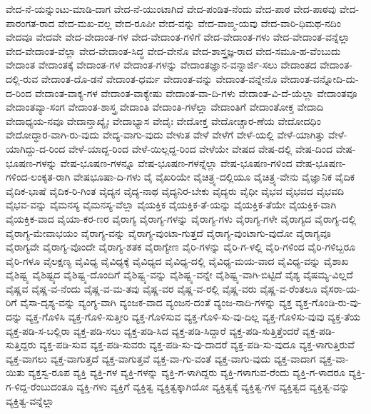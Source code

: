 ವೇದ-ನೆ-ಯನ್ನುಂಟು-ಮಾಡಿ-ದಾಗ
ವೇದ-ನೆ-ಯುಂಟಾಗಿದೆ
ವೇದ-ಪಂಡಿತ-ನೆಂದು
ವೇದ-ಪಾಠ
ವೇದ-ಪಾಠವು
ವೇದ-ಪಾರಂಗತ-ರಾದ
ವೇದ-ಮಖ-ವಲ್ಲ
ವೇದ-ರೂಪೀ
ವೇದ-ವನ್ನು
ವೇದ-ವಾಙ್ಮ-ಯವು
ವೇದ-ವಾರಿ-ಧಿಮಥ-ನದಿಂ
ವೇದವೂ
ವೇದವೇ
ವೇದ-ವೇದಾಂತ-ಗಳ
ವೇದ-ವೇದಾಂತ-ಗಳಿಗೆ
ವೇದ-ವೇದಾಂತ-ಗಳು
ವೇದ-ವೇದಾಂತ-ವನ್ನೆಲ್ಲಾ
ವೇದ-ವೇದಾಂತ-ವೆಲ್ಲಾ
ವೇದ-ವೇದಾಂತ-ಸಿದ್ಧ
ವೇದ-ವೇನೊ
ವೇದ-ಶಾಸ್ತ್ರಜ್ಞ-ರಾದ
ವೇದ-ಸಮೂ-ಹ-ವೆಂಬುದು
ವೇದಾಂತ
ವೇದಾಂತಕ್ಕೆ
ವೇದಾಂತ-ಗಳ
ವೇದಾಂತ-ಗಳನ್ನು
ವೇದಾಂತಜ್ಞಾನ-ವನ್ನಾರ್ಜಿ-ಸಲು
ವೇದಾಂತದ
ವೇದಾಂತ-ದಲ್ಲಿ-ರುವ
ವೇದಾಂತ-ದೊ-ಡನೆ
ವೇದಾಂತ-ಧರ್ಮ
ವೇದಾಂತ-ವನ್ನು
ವೇದಾಂತ-ವನ್ನೇನೊ
ವೇದಾಂತ-ವನ್ನೋದಿ-ದು-ದ-ರಿಂದ
ವೇದಾಂತ-ವಾಕ್ಯ-ಗಳ
ವೇದಾಂತ-ವಾಕ್ಯೇಷು
ವೇದಾಂತ-ವಾ-ದಿ-ಗಳು
ವೇದಾಂತ-ವಿ-ದೆ-ಯೆಲ್ಲಾ
ವೇದಾಂತವೂ
ವೇದಾಂತವ್ಯಾ-ಸಂಗ
ವೇದಾಂತ-ಶಾಸ್ತ್ರ
ವೇದಾಂತಿ
ವೇದಾಂತಿ-ಗಳೆಲ್ಲಾ
ವೇದಾಂತಿಗೆ
ವೇದಾಂತೋಕ್ತ
ವೇದಾದಿ
ವೇದಾಧ್ಯಯ-ನವೂ
ವೇದಾನ್ತಾಖ್ಯೈಃ
ವೇದಾಭ್ಯಾಸ
ವೇದೈಃ
ವೇದೋಕ್ತ
ವೇದೋಚ್ಚಾರ-ಣೆಯ
ವೇದೋದಧಿಂ
ವೇದೋದ್ಧಾರ-ವಾಗಿ-ರು-ವುದು
ವೇದ್ಯ-ವಾಗು-ವುದು
ವೇಳುತ
ವೇಳೆ
ವೇಳೆಗೆ
ವೇಳೆ-ಯಲ್ಲಿ
ವೇಳೆ-ಯಾಗಿತ್ತು
ವೇಳೆ-ಯಾಗಿದ್ದು-ದ-ರಿಂದ
ವೇಳೆ-ಯಾದ್ದ-ರಿಂದ
ವೇಳೆ-ಯಿಲ್ಲದ್ದ-ರಿಂದ
ವೇಳೆಯೇ
ವೇಷದ
ವೇಷ-ದಲ್ಲಿ
ವೇಷ-ದಿಂದ
ವೇಷ-ಭೂಷಣ-ಗಳನ್ನು
ವೇಷ-ಭೂಷಣ-ಗಳನ್ನೂ
ವೇಷ-ಭೂಷಣ-ಗಳನ್ನೆಲ್ಲಾ
ವೇಷ-ಭೂಷಣ-ಗಳಿಂದ
ವೇಷ-ಭೂಷಣ-ಗಳಿಂದ-ಲಂಕೃತ-ರಾಗಿ
ವೇಷಭೂಷಾ-ದಿ-ಗಳು
ವೈ
ವೈಖರಿಯೇ
ವೈಚಿತ್ರ್ಯ-ದಲ್ಲಿಯೂ
ವೈಚಿತ್ರ್ಯ-ವೇನು
ವೈಜ್ಞಾನಿಕ
ವೈದಿಕ
ವೈದಿಕ-ಭಾಷೆ
ವೈದಿಕ-ರಿ-ಗಿಂತ
ವೈದ್ಯನ
ವೈದ್ಯ-ನಾಥ
ವೈದ್ಯನಿರ-ಬೇಕು
ವೈದ್ಯರು
ವೈಧೀ
ವೈಭವ
ವೈಭವದ
ವೈಭವದಿ
ವೈಭವ-ವನ್ನು
ವೈಮನಸ್ಯ
ವೈಮನಸ್ಯ-ವೆಲ್ಲಾ
ವೈಯಕ್ತಿಕ
ವೈಯಕ್ತಿಕ-ತೆ-ಯನ್ನು
ವೈಯಕ್ತಿಕ-ತೆಯೇ
ವೈಯಕ್ತಿಕ-ವಾಗಿ
ವೈಯಕ್ತಿಕ-ವಾದ
ವೈಯಾ-ಕರ-ಣರ
ವೈರಾಗ್ಯ
ವೈರಾಗ್ಯ-ಗಳನ್ನು
ವೈರಾಗ್ಯ-ಗಳು
ವೈರಾಗ್ಯ-ಗಳೇ
ವೈರಾಗ್ಯದ
ವೈರಾಗ್ಯ-ದಲ್ಲಿ
ವೈರಾಗ್ಯ-ಮೇವಾಭಯಂ
ವೈರಾಗ್ಯ-ವನ್ನು
ವೈರಾಗ್ಯ-ವುಂಟಾ-ಗುತ್ತದೆ
ವೈರಾಗ್ಯ-ವುಂಟಾಗು-ವುದೋ
ವೈರಾಗ್ಯವೂ
ವೈರಾಗ್ಯವೇ
ವೈರಾಗ್ಯ-ವೊಂದೇ
ವೈರಾಗ್ಯ-ಶತಕ
ವೈರಾಗ್ಯೇಣ
ವೈರಿ-ಗಳನ್ನು
ವೈರಿ-ಗ-ಳಲ್ಲಿ
ವೈರಿ-ಗಳಿಂದ
ವೈರಿ-ಗಳಿಬ್ಬರೂ
ವೈರಿ-ಗಳೂ
ವೈಲಕ್ಷಣ್ಯ
ವೈವಿಧ್ಯ
ವೈವಿಧ್ಯಕ್ಕೆ
ವೈವಿಧ್ಯದ
ವೈವಿಧ್ಯ-ದಲ್ಲಿ
ವೈವಿಧ್ಯ-ಮಯ-ವಾದ
ವೈವಿಧ್ಯ-ವನ್ನು
ವೈಶಾಖ
ವೈಶಿಷ್ಟ್ಯ
ವೈಶಿಷ್ಟ್ಯದ
ವೈಶಿಷ್ಟ್ಯ-ದೊಂದಿಗೆ
ವೈಶಿಷ್ಟ್ಯ-ವನ್ನು
ವೈಶಿಷ್ಟ್ಯ-ವನ್ನೇ
ವೈಶಿಷ್ಟ್ಯ-ವಾಗಿ-ಬಿಟ್ಟಿದೆ
ವೈಶ್ಯ
ವೈಷಮ್ಯ-ವಿಲ್ಲದೆ
ವೈಷ್ಣವ
ವೈಷ್ಣ-ವ-ನೆಂದು
ವೈಷ್ಣ-ವ-ಮ-ತವು
ವೈಷ್ಣ-ವರ
ವೈಷ್ಣ-ವ-ರಲ್ಲಿ
ವೈಷ್ಣ-ವರು
ವೈಷ್ಣ-ವ-ರೆಂತಲೂ
ವೈಸರಾ-ಯ-ರಿಗೆ
ವೈಸಾ-ದೃಶ್ಯ-ವನ್ನು
ವ್ಯಂಗ್ಯ-ವಾಗಿ
ವ್ಯಂಜಕ-ವಾದ
ವ್ಯಂಜನ-ದಂತೆ
ವ್ಯಂಜ-ನಾದಿ-ಗಳನ್ನು
ವ್ಯಕ್ತ
ವ್ಯಕ್ತ-ಗೊಂಡಿ-ರು-ವು-ದನ್ನು
ವ್ಯಕ್ತ-ಗೊಳಿಸಿ
ವ್ಯಕ್ತ-ಗೊಳಿ-ಸುತ್ತೀರಿ
ವ್ಯಕ್ತ-ಗೊಳಿಸುವ
ವ್ಯಕ್ತ-ಗೊಳಿ-ಸು-ವು-ದಿಲ್ಲ
ವ್ಯಕ್ತ-ಗೊಳಿಸು-ವುವು
ವ್ಯಕ್ತ-ತೆಯ
ವ್ಯಕ್ತ-ಪಡಿ-ಸ-ಬಲ್ಲಿರಾ
ವ್ಯಕ್ತ-ಪಡಿ-ಸಲು
ವ್ಯಕ್ತ-ಪಡಿ-ಸಿದ
ವ್ಯಕ್ತ-ಪಡಿ-ಸಿದ್ದಾರೆ
ವ್ಯಕ್ತ-ಪಡಿ-ಸುತ್ತಿತ್ತೆಂದರೆ
ವ್ಯಕ್ತ-ಪಡಿ-ಸುತ್ತಿದ್ದರು
ವ್ಯಕ್ತ-ಪಡಿ-ಸುವ
ವ್ಯಕ್ತ-ಪಡಿ-ಸುವರು
ವ್ಯಕ್ತ-ಪಡಿ-ಸು-ವು-ದಾದರೆ
ವ್ಯಕ್ತ-ಪಡಿ-ಸು-ವುದೂ
ವ್ಯಕ್ತ-ಳಾಗುತ್ತಿರುವೆ
ವ್ಯಕ್ತ-ವಾಗಲು
ವ್ಯಕ್ತ-ವಾಗುತ್ತದೆ
ವ್ಯಕ್ತ-ವಾಗುತ್ತವೆ
ವ್ಯಕ್ತ-ವಾ-ಗು-ವಂತೆ
ವ್ಯಕ್ತ-ವಾಗು-ವುದು
ವ್ಯಕ್ತ-ವಾದಾಗ
ವ್ಯಕ್ತ-ವಾ-ಯಿತು
ವ್ಯಕ್ತಸ್ವ-ರೂಪ
ವ್ಯಕ್ತಿ
ವ್ಯಕ್ತಿ-ಗಳ
ವ್ಯಕ್ತಿ-ಗಳನ್ನು
ವ್ಯಕ್ತಿ-ಗ-ಳಾಗಿದ್ದರು
ವ್ಯಕ್ತಿ-ಗಳಾಗುವ-ರೆಂದು
ವ್ಯಕ್ತಿ-ಗ-ಳಾದರೂ
ವ್ಯಕ್ತಿ-ಗ-ಳಿದ್ದ-ರೆಂಬುದಂತೂ
ವ್ಯಕ್ತಿ-ಗಳು
ವ್ಯಕ್ತಿಗೆ
ವ್ಯಕ್ತಿತ್ವ
ವ್ಯಕ್ತಿತ್ವಕ್ಕಾಗಿಯೋ
ವ್ಯಕ್ತಿತ್ವಕ್ಕೆ
ವ್ಯಕ್ತಿತ್ವ-ಗಳ
ವ್ಯಕ್ತಿತ್ವದ
ವ್ಯಕ್ತಿತ್ವ-ವನ್ನು
ವ್ಯಕ್ತಿತ್ವ-ವನ್ನೆಲ್ಲಾ
